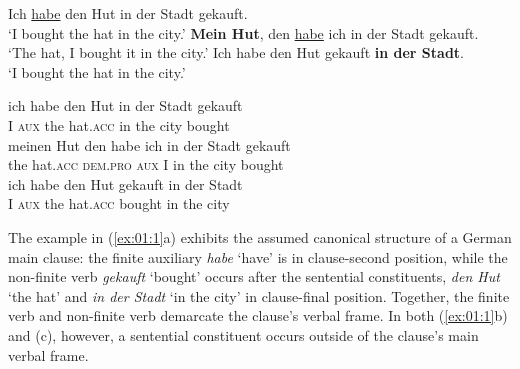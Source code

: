 \ea%
    \label{ex:01:1}
  \ea          Ich \ul{habe} den Hut in der Stadt gekauft.\\
  ‘I bought the hat in the city.’
  \ex  \textbf{Mein Hut}, den \ul{habe} ich in der Stadt gekauft.\\
  ‘The hat, I bought it in the city.’
  \ex  Ich habe den Hut gekauft \textbf{in der Stadt}. \\
  ‘I bought the hat in the city.’
\z
\z

\ea
\ea \gll ich  habe  den Hut     in der Stadt   gekauft\\
  I  \textsc{aux}    the hat.\textsc{acc}     in the city  bought\\

\ex  \gll meinen Hut  den       habe   ich   in der Stadt  gekauft\\
  the hat.\textsc{acc}   \textsc{dem.pro}   \textsc{aux}    I   in the city   bought\\

\ex   \gll ich   habe  den Hut   gekauft  in der Stadt\\
I  \textsc{aux}    the hat.\textsc{acc}  bought  in the city\\

\z
\z


\noindent The example in (\ref{ex:01:1}a) exhibits the assumed canonical structure of a German main clause: the finite auxiliary \textit{habe} ‘have’ is in clause-second position, while the non-finite verb \textit{gekauft} ‘bought’ occurs after the sentential constituents, \textit{den Hut} ‘the hat’ and \textit{in der Stadt} ‘in the city’ in clause-final position. Together, the finite verb and non-finite verb demarcate the clause’s verbal frame. In both (\ref{ex:01:1}b) and (c), however, a sentential constituent occurs outside of the clause’s main verbal frame. 

